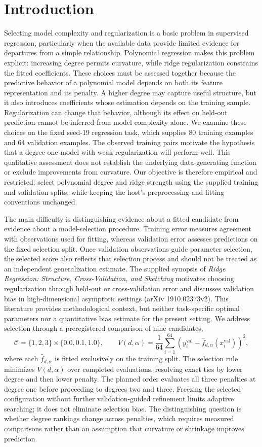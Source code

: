 \documentclass[11pt]{article}
\begin{document}
\section{Introduction}
Selecting model complexity and regularization is a basic problem in supervised regression, particularly when the available data provide limited evidence for departures from a simple relationship. Polynomial regression makes this problem explicit: increasing degree permits curvature, while ridge regularization constrains the fitted coefficients. These choices must be assessed together because the predictive behavior of a polynomial model depends on both its feature representation and its penalty. A higher degree may capture useful structure, but it also introduces coefficients whose estimation depends on the training sample. Regularization can change that behavior, although its effect on held-out prediction cannot be inferred from model complexity alone. We examine these choices on the fixed seed-19 regression task, which supplies 80 training examples and 64 validation examples. The observed training pairs motivate the hypothesis that a degree-one model with weak regularization will perform well. This qualitative assessment does not establish the underlying data-generating function or exclude improvements from curvature. Our objective is therefore empirical and restricted: select polynomial degree and ridge strength using the supplied training and validation splits, while keeping the host's preprocessing and fitting conventions unchanged.

The main difficulty is distinguishing evidence about a fitted candidate from evidence about a model-selection procedure. Training error measures agreement with observations used for fitting, whereas validation error assesses predictions on the fixed selection split. Once validation observations guide parameter selection, the selected score also reflects that selection process and should not be treated as an independent generalization estimate. The supplied synopsis of \emph{Ridge Regression: Structure, Cross-Validation, and Sketching} motivates choosing regularization through held-out or cross-validation error and discusses validation bias in high-dimensional asymptotic settings (arXiv 1910.02373v2). This literature provides methodological context, but neither task-specific optimal parameters nor a quantitative bias estimate for the present setting. We address selection through a preregistered comparison of nine candidates,
\[
\mathcal{C}=\{1,2,3\}\times\{0.0,0.1,1.0\},
\qquad
V(d,\alpha)=\frac{1}{64}\sum_{i=1}^{64}
\left(y_i^{\mathrm{val}}-\widehat f_{d,\alpha}(x_i^{\mathrm{val}})\right)^2,
\]
where each \(\widehat f_{d,\alpha}\) is fitted exclusively on the training split. The selection rule minimizes \(V(d,\alpha)\) over completed evaluations, resolving exact ties by lower degree and then lower penalty. The planned order evaluates all three penalties at degree one before proceeding to degrees two and three. Freezing the selected configuration without further validation-guided refinement limits adaptive searching; it does not eliminate selection bias. The distinguishing question is whether degree rankings change across penalties, which requires measured comparisons rather than an assumption that curvature or shrinkage improves prediction.
\end{document}
